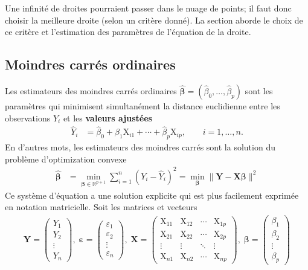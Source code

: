 \documentclass[
  11pt,
  letterpaper,
]{article}
\theoremstyle{definition}
\theoremstyle{definition}
\theoremstyle{definition}
\theoremstyle{definition}
\theoremstyle{remark}
\begin{document}
Une infinité de droites pourraient passer dans le nuage de points; il faut donc choisir la meilleure droite (selon un critère donné). La section aborde le choix de ce critère et l'estimation des paramètres de l'équation de la droite.

\hypertarget{moindres-carruxe9s-ordinaires}{%
\subsection{Moindres carrés ordinaires}\label{moindres-carruxe9s-ordinaires}}

Les estimateurs des moindres carrés ordinaires \(\widehat{\boldsymbol{\beta}}=(\widehat{\beta}_0, \ldots, \widehat{\beta}_p)\) sont les paramètres qui minimisent simultanément la distance euclidienne entre les observations \(Y_i\) et les \textbf{valeurs ajustées}
\begin{align*}
 \widehat{Y}_i &= \widehat{\beta}_0 + \widehat{\beta}_1 \mathrm{X}_{i1} + \cdots + \widehat{\beta}_p \mathrm{X}_{ip}, \qquad i =1, \ldots, n.
\end{align*}
En d'autres mots, les estimateurs des moindres carrés sont la solution du problème d'optimization convexe
\begin{align*}
\widehat{\boldsymbol{\beta}} &=\min_{\boldsymbol{\beta} \in \mathbb{R}^{p+1}}\sum_{i=1}^n (Y_i-\widehat{Y}_i)^2= \min_{\boldsymbol{\beta}} \|\boldsymbol{Y}-\mathbf{X}\boldsymbol{\beta}\|^2
\end{align*}
Ce système d'équation a une solution explicite qui est plus facilement exprimée en notation matricielle. Soit les matrices et vecteurs
\begin{align*}
\boldsymbol{Y} =
 \begin{pmatrix}
  Y_1 \\
  Y_2 \\
  \vdots \\
  Y_n
 \end{pmatrix} ,
 \;
 \boldsymbol{\varepsilon} =
 \begin{pmatrix}
  \varepsilon_1 \\
  \varepsilon_2 \\
  \vdots \\
  \varepsilon_n
 \end{pmatrix} ,
 \;
\mathbf{X} = \begin{pmatrix}
\mathrm{X}_{11} & \mathrm{X}_{12} & \cdots & \mathrm{X}_{1p} \\
\mathrm{X}_{21} & \mathrm{X}_{22} & \cdots & \mathrm{X}_{2p} \\
\vdots & \vdots & \ddots & \vdots \\
\mathrm{X}_{n1} & \mathrm{X}_{n2} & \cdots & \mathrm{X}_{np}
\end{pmatrix} , \;
\boldsymbol{\beta} =
 \begin{pmatrix}
  \beta_1 \\
  \beta_2 \\
  \vdots \\
  \beta_p
 \end{pmatrix}
\end{align*}
\end{document}

